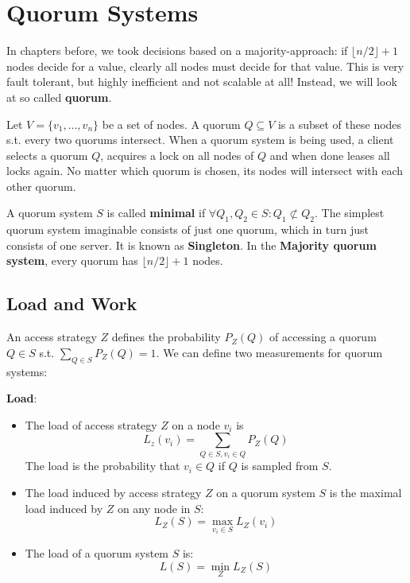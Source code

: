 \section{Quorum Systems}

In chapters before, we took decisions based on a majority-approach: if $\lfloor n/2 \rfloor + 1$ nodes decide for a value, clearly all nodes must decide for that value. This is very fault tolerant, but highly inefficient and not scalable at all! Instead, we will look at so called \textbf{quorum}. \medskip

Let $V = \{v_1, ..., v_n\}$ be a set of nodes. A quorum $Q \subseteq V$ is a subset of these nodes s.t. every two quorums intersect. When a quorum system is being used, a client selects a quorum $Q$, acquires a lock on all nodes of $Q$ and when done leases all locks again. No matter which quorum is chosen, its nodes will intersect with each other quorum. \medskip

A quorum system $S$ is called \textbf{minimal} if $\forall Q_1, Q_2 \in S : Q_1 \not\subset Q_2$. The simplest quorum system imaginable consists of just one quorum, which in turn just consists of one server. It is known as \textbf{Singleton}. In the \textbf{Majority quorum system}, every quorum has $\lfloor n/2 \rfloor + 1$ nodes.


\subsection{Load and Work}

An access strategy $Z$ defines the probability $P_Z(Q)$ of accessing a quorum $Q \in S$ s.t. $\sum_{Q \in S} P_Z(Q) = 1$. We can define two measurements for quorum systems: \medskip

\textbf{Load}:
\begin{itemize}
	\item The load of access strategy $Z$ on a node $v_i$ is 
		  $$L_z(v_i) = \sum_{Q \in S, v_i \in Q} P_Z(Q)$$
		  The load is the probability that $v_i \in Q$ if $Q$ is sampled from $S$.
		  
	\item The load induced by access strategy $Z$ on a quorum system $S$ is the maximal load induced by $Z$ on any node in $S$:
		  $$L_Z(S) = \max_{v_i \in S} L_Z(v_i) $$
	
	\item The load of a quorum system $S$ is:
	 	  $$L(S) = \min_Z L_Z(S)$$
\end{itemize}

